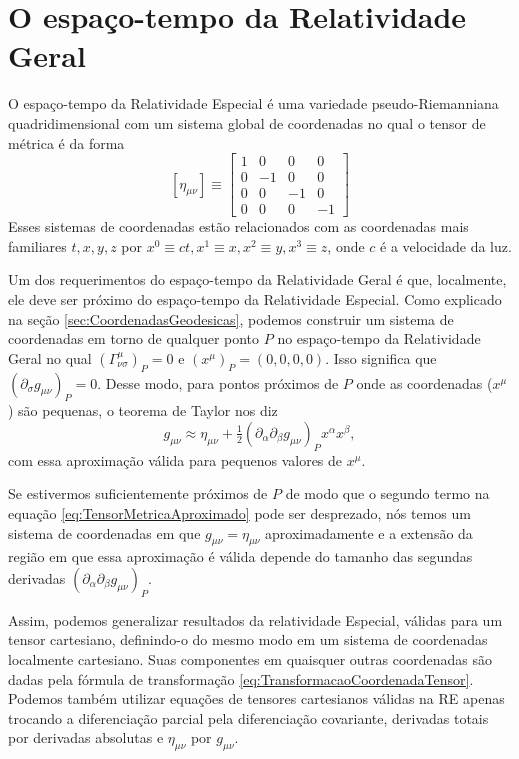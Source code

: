 \section{O espaço-tempo da Relatividade Geral}\label{sec:EspacotempoRelatividadeGeral}

O espaço-tempo da Relatividade Especial é uma variedade pseudo-Riemanniana quadridimensional com um sistema global de coordenadas no qual o tensor de métrica é da forma
\[
\left[\eta_{\mu \nu}\right] \equiv\left[\begin{array}{rrrr}{1} & {0} & {0} & {0} \\ {0} & {-1} & {0} & {0} \\ {0} & {0} & {-1} & {0} \\ {0} & {0} & {0} & {-1}\end{array}\right]
\]
Esses sistemas de coordenadas estão relacionados com as coordenadas mais familiares $ t, x, y, z $ por $ x^0 \equiv ct, x^1\equiv x, x^2\equiv y, x^3 \equiv z $, onde $ c $ é a velocidade da luz.

Um dos requerimentos do espaço-tempo da Relatividade Geral é que, localmente, ele deve ser próximo do espaço-tempo da Relatividade Especial.  Como explicado na seção \ref{sec:CoordenadasGeodesicas}, podemos construir um sistema de coordenadas em torno de qualquer ponto $ P $ no espaço-tempo da Relatividade Geral no qual $ \left(\Gamma_{\nu \sigma}^{\mu}\right)_{P}=0 $ e $ \left(x^{\mu}\right)_{P}=(0,0,0,0) $. Isso significa que $ \left(\partial_{\sigma} g_{\mu \nu}\right)_{P}=0 $. Desse modo, para pontos próximos de $ P $ onde as coordenadas ($ x^\mu $) são pequenas, o teorema de Taylor nos diz
\begin{equation}\label{eq:TensorMetricaAproximado}
g_{\mu \nu} \approx \eta_{\mu \nu}+\tfrac{1}{2}\left(\partial_{\alpha} \partial_{\beta} g_{\mu \nu}\right)_{P} x^{\alpha} x^{\beta} ,
\end{equation}
com essa aproximação válida para pequenos valores de $x^\mu$.

Se estivermos suficientemente próximos de $P$ de modo que o segundo termo na equação \eqref{eq:TensorMetricaAproximado} pode ser desprezado, nós temos um sistema de coordenadas em que $g_{\mu\nu}=\eta_{\mu\nu}$ aproximadamente e a extensão da região em que essa aproximação é válida depende do tamanho das segundas derivadas $\left(\partial_{\alpha} \partial_{\beta} g_{\mu \nu}\right)_{P}$. 

Assim, podemos generalizar resultados da relatividade Especial, válidas para um tensor cartesiano, definindo-o do mesmo modo em um sistema de coordenadas localmente cartesiano. Suas componentes em quaisquer outras coordenadas são dadas pela fórmula de transformação \eqref{eq:TransformacaoCoordenadaTensor}. Podemos também utilizar equações de tensores cartesianos válidas na RE apenas trocando a diferenciação parcial pela diferenciação covariante, derivadas totais por derivadas absolutas e $\eta_{\mu\nu}$ por $g_{\mu\nu}$.

